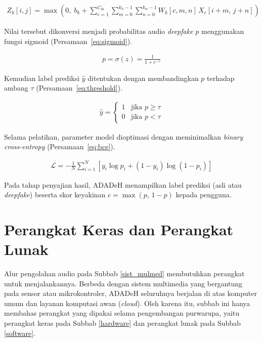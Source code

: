 \begin{align}
  Z_k[i,j] = \max\left(0,\; b_k + \sum_{c=1}^{C_{\mathrm{in}}} \sum_{m=0}^{k_h-1} \sum_{n=0}^{k_w-1} W_k[c,m,n]\, X_c[i+m,\, j+n]\right)
  \label{eq:conv}
\end{align}

Nilai tersebut dikonversi menjadi probabilitas audio \textit{deepfake} $p$ menggunakan fungsi sigmoid (Persamaan~\ref{eq:sigmoid}).

\begin{align}
  p = \sigma(z) = \frac{1}{1 + e^{-z}}
  \label{eq:sigmoid}
\end{align}

Kemudian label prediksi $\hat{y}$ ditentukan dengan membandingkan $p$ terhadap ambang $\tau$ (Persamaan~\ref{eq:threshold}).

\begin{align}
  \hat{y} =
  \begin{cases}
    1 & \text{jika } p \geq \tau \\
    0 & \text{jika } p < \tau
  \end{cases}
  \label{eq:threshold}
\end{align}

Selama pelatihan, parameter model dioptimasi dengan meminimalkan \textit{binary cross-entropy} (Persamaan~\ref{eq:bce}).

\begin{align}
  \mathcal{L} = -\frac{1}{N} \sum_{i=1}^{N} \left[ y_i \log p_i + (1 - y_i) \log (1 - p_i) \right]
  \label{eq:bce}
\end{align}

Pada tahap penyajian hasil, ADADeH menampilkan label prediksi (asli atau \textit{deepfake}) beserta skor keyakinan $c = \max(p,\, 1-p)$ kepada pengguna.

\section{Perangkat Keras dan Perangkat Lunak}
\label{soft_hard_ware}

Alur pengolahan audio pada Subbab \ref{sist_mulmed} membutuhkan perangkat untuk menjalankannya. Berbeda dengan sistem multimedia yang bergantung pada sensor atau mikrokontroler, ADADeH seluruhnya berjalan di atas komputer umum dan layanan komputasi awan (\textit{cloud}). Oleh karena itu, subbab ini hanya membahas perangkat yang dipakai selama pengembangan purwarupa, yaitu perangkat keras pada Subbab \ref{hardware} dan perangkat lunak pada Subbab \ref{software}.

